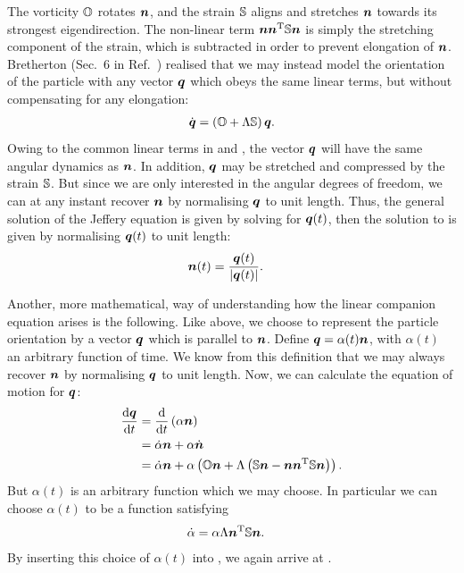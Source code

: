 \documentclass[thesis.tex]{subfiles}
\begin{document}
The vorticity $\mathbb{O}$ rotates $\mbox{\boldmath$n$}$, and the strain $\mathbb{S}$ aligns and stretches $\mbox{\boldmath$n$}$ towards its strongest eigendirection. The non-linear term $\mbox{\boldmath$n$} \mbox{\boldmath$n$}^{\mathrm T} \mathbb{S} \mbox{\boldmath$n$}$ is simply the stretching component of the strain, which is subtracted in order to prevent elongation of $\mbox{\boldmath$n$}$. Bretherton (Sec.~6 in Ref.~\cite{bretherton1962}) realised that we may instead model the orientation of the particle with any vector $\mbox{\boldmath$q$}$ which obeys the same linear terms, but without compensating for any elongation:
\begin{align}
	\dot{\ve q} = \left(\ma O + \Lambda \ma S\right) \ve q.\eqnlab{jefferyq}
\end{align}
Owing to the common linear terms in  and , the vector $\mbox{\boldmath$q$}$ will have the same angular dynamics as $\mbox{\boldmath$n$}$. In addition, $\mbox{\boldmath$q$}$ may be stretched and compressed by the strain $\mathbb{S}$. But since we are only interested in the angular degrees of freedom, we can at any instant recover $\mbox{\boldmath$n$}$ by normalising $\mbox{\boldmath$q$}$ to unit length. Thus, the general solution of the Jeffery equation is given by solving  for $\mbox{\boldmath$q$}(t)$, then the solution to  is given by normalising $\mbox{\boldmath$q$}(t)$ to unit length:
\begin{align}
	\ve n(t) &= \frac{\ve q(t)}{|\ve q(t)|}.\eqnlab{jefferysolution0}
\end{align}

Another, more mathematical, way of understanding how the linear companion equation  arises is the following. Like above, we choose to represent the particle orientation by a vector $\mbox{\boldmath$q$}$ which is parallel to $\mbox{\boldmath$n$}$. Define $\mbox{\boldmath$q$} = \alpha(t)\mbox{\boldmath$n$}$, with $\alpha(t)$ an arbitrary function of time. We know from this definition that we may always recover $\mbox{\boldmath$n$}$ by normalising $\mbox{\boldmath$q$}$ to unit length. Now, we can calculate the equation of motion for $\mbox{\boldmath$q$}$:
\begin{align}
	\diff{\ve q}{t} &= \diff{}{t}\left(\alpha \ve n\right) \nn \\
	&= \dot \alpha \ve n + \alpha \dot{\ve n} \nn\\
	&= \dot \alpha \ve n + \alpha \left(\ma O \ve n + \Lambda \left(\ma S \ve n - \ve n \ve n \transpose \ma S \ve n\right)\right). \eqnlab{jefferyderivation1}
\end{align}
But $\alpha(t)$ is an arbitrary function which we may choose. In particular we can choose $\alpha(t)$ to be a function satisfying
\begin{align*}
	\dot \alpha &= \alpha \Lambda \mbox{\boldmath$n$}^{\mathrm T} \mathbb{S} \mbox{\boldmath$n$}.
\end{align*}
By inserting this choice of $\alpha(t)$ into , we again arrive at .
\end{document}

